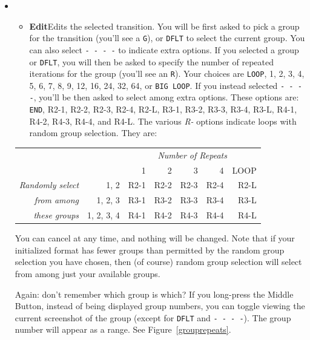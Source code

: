 \documentclass{article}
\begin{document}
 \begin{itemize}
\item[]~\vspace{-2em}
\begin{itemize}
	\item {\bf Edit}\quad Edits the selected transition.  You will be first asked to pick a group for the transition (you'll see a \texttt{G}), or \texttt{DFLT} to select the current group.  You can also select \texttt{- - - -} to indicate extra options.  If you selected a group or \texttt{DFLT}, you will then be asked to specify the number of repeated iterations for the group (you'll see an \texttt{R}).  Your choices are \texttt{LOOP}, 1, 2, 3, 4, 5, 6, 7, 8, 9, 12, 16, 24, 32, 64, or \texttt{BIG LOOP}.  If you instead selected \texttt{- - - -}, you'll be then asked to select among extra options.  These options are: \texttt{END}, R2-1, R2-2, R2-3, R2-4, R2-L, R3-1, R3-2, R3-3, R3-4, R3-L, R4-1, R4-2, R4-3, R4-4, and R4-L.  The various {\it R-} options indicate loops with random group selection. They are:

\end{itemize}


\setlength{\leftskip}{2.3em}
\setlength{\rightskip}{-16.9em}

\hspace{6.5em}\begin{tabular}{r@{~~~}r|rrrrr}
		&&\multicolumn{5}{c}{\it Number of Repeats}\\
				&&1&2&3&4&LOOP\\
				\hline
		\it Randomly select&1, 2&R2-1&R2-2&R2-3&R2-4&R2-L\\
		 \it from among &1, 2, 3&R3-1&R3-2&R3-3&R3-4&R3-L\\
		\it these groups&1, 2, 3, 4&R4-1&R4-2&R4-3&R4-4&R4-L\\
\end{tabular}
\vspace{1em}

You can cancel at any time, and nothing will be changed.  Note that if your initialized format has fewer groups than permitted by the random group selection you have chosen, then (of course) random group selection will select from among just your available groups.
	  
Again: don't remember which group is which?  If you long-press the Middle Button, instead of being displayed group numbers, you can toggle viewing the current screenshot of the group (except for \texttt{DFLT} and \texttt{- - - -}).  The group number will appear as a range.  See Figure~\ref{grouprepeats}.


\end{itemize}
\end{document}
